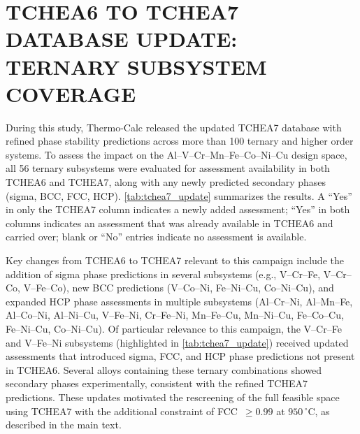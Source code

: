 \documentclass[final,5p,times,twocolumn]{elsarticle}
\begin{document}
\section{TCHEA6 TO TCHEA7 DATABASE UPDATE: TERNARY SUBSYSTEM COVERAGE}
\label{s1_tchea7_update}

During this study, Thermo-Calc released the updated TCHEA7 database with refined phase stability predictions across more than 100 ternary and higher order systems. To assess the impact on the Al--V--Cr--Mn--Fe--Co--Ni--Cu design space, all 56 ternary subsystems were evaluated for assessment availability in both TCHEA6 and TCHEA7, along with any newly predicted secondary phases (sigma, BCC, FCC, HCP). \autoref{tab:tchea7_update} summarizes the results. A ``Yes'' in only the TCHEA7 column indicates a newly added assessment; ``Yes'' in both columns indicates an assessment that was already available in TCHEA6 and carried over; blank or ``No'' entries indicate no assessment is available.

Key changes from TCHEA6 to TCHEA7 relevant to this campaign include the addition of sigma phase predictions in several subsystems (e.g., V--Cr--Fe, V--Cr--Co, V--Fe--Co), new BCC predictions (V--Co--Ni, Fe--Ni--Cu, Co--Ni--Cu), and expanded HCP phase assessments in multiple subsystems (Al--Cr--Ni, Al--Mn--Fe, Al--Co--Ni, Al--Ni--Cu, V--Fe--Ni, Cr--Fe--Ni, Mn--Fe--Cu, Mn--Ni--Cu, Fe--Co--Cu, Fe--Ni--Cu, Co--Ni--Cu). Of particular relevance to this campaign, the V--Cr--Fe and V--Fe--Ni subsystems (highlighted in \autoref{tab:tchea7_update}) received updated assessments that introduced sigma, FCC, and HCP phase predictions not present in TCHEA6. Several alloys containing these ternary combinations showed secondary phases experimentally, consistent with the refined TCHEA7 predictions. These updates motivated the rescreening of the full feasible space using TCHEA7 with the additional constraint of FCC~$\geq 0.99$ at $950\,^{\circ}$C, as described in the main text.
\end{document}
